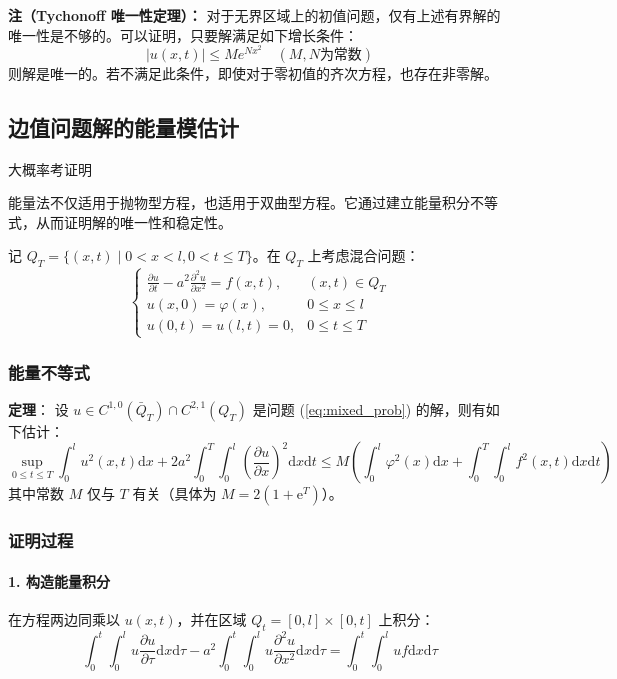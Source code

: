 \documentclass[12pt,a4paper]{ctexart}
\begin{document}
	\textbf{注（Tychonoff 唯一性定理）：}
	对于无界区域上的初值问题，仅有上述有界解的唯一性是不够的。可以证明，只要解满足如下增长条件：
	\[
	|u(x,t)| \leqslant M e^{Nx^2} \quad (M, N \text{为常数})
	\]
	则解是唯一的。若不满足此条件，即使对于零初值的齐次方程，也存在非零解。
	
	\subsection{边值问题解的能量模估计}
	
	大概率考证明
	
	能量法不仅适用于抛物型方程，也适用于双曲型方程。它通过建立能量积分不等式，从而证明解的唯一性和稳定性。
	
	记 $Q_T = \{(x,t) \mid 0 < x < l, 0 < t \leqslant T\}$。在 $Q_T$ 上考虑混合问题：
	\begin{equation}
		\begin{cases}
			\frac{\partial u}{\partial t} - a^2 \frac{\partial^2 u}{\partial x^2} = f(x,t), & (x,t) \in Q_T \\
			u(x,0) = \varphi(x), & 0 \leqslant x \leqslant l \\
			u(0,t) = u(l,t) = 0, & 0 \leqslant t \leqslant T
		\end{cases}
		\label{eq:mixed_prob}
	\end{equation}
	
	\subsubsection{能量不等式}
	
	\textbf{定理}：
	设 $u \in C^{1,0}(\bar{Q}_T) \cap C^{2,1}(Q_T)$ 是问题 (\ref{eq:mixed_prob}) 的解，则有如下估计：
	\begin{equation}
		\sup_{0 \leqslant t \leqslant T} \int_0^l u^2(x,t) \mathrm{d}x + 2a^2 \int_0^T \int_0^l \left( \frac{\partial u}{\partial x} \right)^2 \mathrm{d}x \mathrm{d}t \leqslant M \left( \int_0^l \varphi^2(x) \mathrm{d}x + \int_0^T \int_0^l f^2(x,t) \mathrm{d}x \mathrm{d}t \right)
	\end{equation}
	其中常数 $M$ 仅与 $T$ 有关（具体为 $M = 2(1 + \mathrm{e}^T)$）。
	
	\subsubsection{证明过程}
	
	\paragraph{1. 构造能量积分}
	在方程两边同乘以 $u(x,t)$，并在区域 $Q_t = [0,l] \times [0,t]$ 上积分：
	\[
	\int_0^t \int_0^l u \frac{\partial u}{\partial \tau} \mathrm{d}x \mathrm{d}\tau - a^2 \int_0^t \int_0^l u \frac{\partial^2 u}{\partial x^2} \mathrm{d}x \mathrm{d}\tau = \int_0^t \int_0^l u f \mathrm{d}x \mathrm{d}\tau
	\]
	
\end{document}
